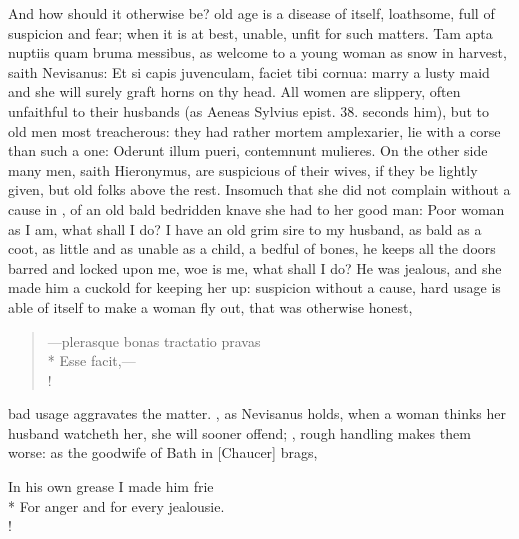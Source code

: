 And how should it otherwise be? old age is a disease of itself,
loathsome, full of suspicion and fear; when it is at best, unable,
unfit for such matters. Tam apta nuptiis quam bruma messibus, as
welcome to a young woman as snow in harvest, saith Nevisanus: Et si
capis juvenculam, faciet tibi cornua: marry a lusty maid and she will
surely graft horns on thy head. All women are slippery, often
unfaithful to their husbands (as Aeneas Sylvius epist. 38. seconds
him), but to old men most treacherous: they had rather mortem
amplexarier, lie with a corse than such a one: Oderunt illum
pueri, contemnunt mulieres. On the other side many men, saith
Hieronymus, are suspicious of their wives, if they be lightly
given, but old folks above the rest. Insomuch that she did not complain
without a cause in \Apuleius{}, of an old bald bedridden knave she
had to her good man: Poor woman as I am, what shall I do? I have an old
grim sire to my husband, as bald as a coot, as little and as unable as
a child, a bedful of bones, he keeps all the doors barred and locked
upon me, woe is me, what shall I do? He was jealous, and she made him a
cuckold for keeping her up: suspicion without a cause, hard usage is
able of itself to make a woman fly out, that was otherwise honest,
%
\begin{latin}
\begin{verse}%
---plerasque bonas tractatio pravas\\*
Esse facit,---\\!
\end{verse}%
\end{latin}
%
%
bad usage aggravates the matter. , as Nevisanus holds, when a
woman thinks her husband watcheth her, she will sooner offend;
, rough handling makes them
worse: as the goodwife of Bath in [Chaucer] brags,
%
{\gothfont%
\begin{versewithlinenos}{2}{1}{1}%
In his own grease I made him frie\\*
For anger and for every jealousie.\\!
\end{versewithlinenos}%
}%

